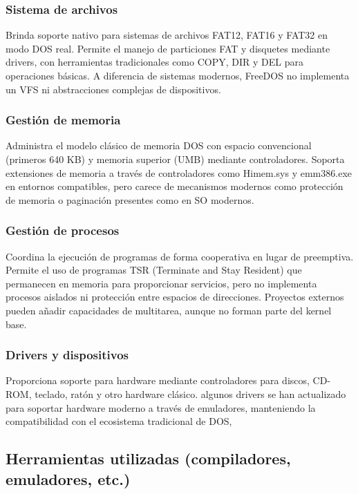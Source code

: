 \subsubsection{Sistema de archivos}
Brinda soporte nativo para sistemas de archivos FAT12, FAT16 y FAT32 en modo DOS real. Permite el manejo de particiones FAT y disquetes mediante drivers, con herramientas tradicionales como COPY, DIR y DEL para operaciones básicas. A diferencia de sistemas modernos, FreeDOS no implementa un VFS ni abstracciones complejas de dispositivos. \citep[pag. 30--33 ]{freedos_kernel}

\subsubsection{Gestión de memoria}
Administra el modelo clásico de memoria DOS con espacio convencional (primeros 640 KB) y memoria superior (UMB) mediante controladores. Soporta extensiones de memoria a través de controladores como Himem.sys y emm386.exe en entornos compatibles, pero carece de mecanismos modernos como protección de memoria o paginación presentes como en SO modernos. \citep[pag. 48 ]{freedos_kernel}

\subsubsection{Gestión de procesos}
Coordina la ejecución de programas de forma cooperativa en lugar de preemptiva. Permite el uso de programas TSR (Terminate and Stay Resident) que permanecen en memoria para proporcionar servicios, pero no implementa procesos aislados ni protección entre espacios de direcciones. Proyectos externos pueden añadir capacidades de multitarea, aunque no forman parte del kernel base. \citep[pag. 50 ]{freedos_kernel}

\subsubsection{Drivers y dispositivos}
Proporciona soporte para hardware mediante controladores para discos, CD-ROM, teclado, ratón y otro hardware clásico. algunos drivers se han actualizado para soportar hardware moderno a través de emuladores, manteniendo la compatibilidad con el ecosistema tradicional de DOS, \citep[pag. 52--53 ]{freedos_kernel}

\subsection{Herramientas utilizadas (compiladores, emuladores, etc.)}


